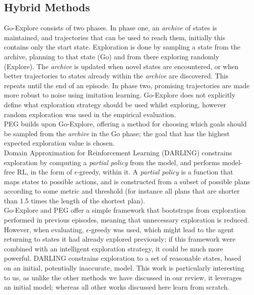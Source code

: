 \subsection{Hybrid Methods}
Go-Explore \cite{DBLP:journals/corr/abs-1901-10995, goexplore} consists of two phases. In phase one, an \textit{archive} of states is maintained, and trajectories that can be used to reach them, initially this contains only the start state. Exploration is done by sampling a state from the archive, planning to that state (Go) and from there exploring randomly (Explore). The \textit{archive} is updated when novel states are encountered, or when better trajectories to states already within the \textit{archive} are discovered. This repeats until the end of an episode. In phase two, promising trajectories are made more robust to noise using imitation learning. Go-Explore does not explicitly define what exploration strategy should be used whilst exploring, however random exploration was used in the empirical evaluation.
\\ PEG \cite{hu2023planning} builds upon Go-Explore, offering a method for choosing which goals should be sampled from the \textit{archive} in the Go phase; the goal that has the highest expected exploration value is chosen.
\\Domain Approximation for Reinforcement Learning (DARLING) \cite{AIJ16-leonetti} constrains exploration by computing a \textit{partial policy} from the model, and performs model-free RL, in the form of $\epsilon$-greedy, within it. A \textit{partial policy} is a function that maps states to possible actions, and is constructed from a subset of possible plans according to some metric and threshold (for instance all plans that are shorter than 1.5 times the length of the shortest plan).
\\Go-Explore and PEG offer a simple framework that bootstraps from exploration performed in previous episodes, meaning that unnecessary exploration is reduced. However, when evaluating, $\epsilon$-greedy was used, which might lead to the agent returning to states it had already explored previously; if this framework were combined with an intelligent exploration strategy, it could be much more powerful. DARLING constrains exploration to a set of reasonable states, based on an initial, potentially inaccurate, model. This work is particularly interesting to us, as unlike the other methods we have discussed in our review, it leverages an initial model; whereas all other works discussed here learn from scratch.
